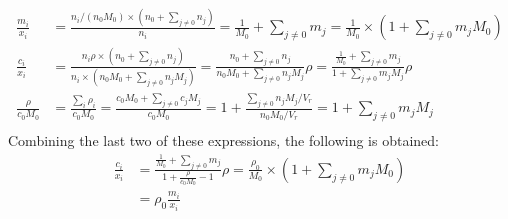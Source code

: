 \documentclass[onecolumn]{article}
\begin{document}
\[
\begin{aligned}
\frac{m_i}{x_i} & = \frac{n_i/(n_0 M_0) \times (n_0 + \sum_{j\neq0}{n_j}) }{n_i} = \frac{1}{M_0} + \sum_{j\neq0}{m_j} = \frac{1}{M_0} \times (1 + \sum_{j\neq0}{m_jM_0}) \\
\frac{c_i}{x_i} & = \frac{n_i \rho \times (n_0 + \sum_{j\neq0}{n_j}) }{n_i \times (n_0 M_0 + \sum_{j\neq0}{n_j M_j})} = \frac{ n_0 + \sum_{j\neq0}{n_j} }{ n_0 M_0 + \sum_{j\neq0}{n_j M_j}} \rho = \frac{ \frac{1}{M_0} + \sum_{j\neq0}{m_j} }{ 1 + \sum_{j\neq0}{m_j M_j}} \rho \\
\frac{\rho}{c_0 M_0} & = \frac{\sum_{i}{\rho_i}}{c_0 M_0} = \frac{c_0 M_0 + \sum_{j \neq 0}{c_j M_j}}{c_0 M_0} = 1 + \frac{\sum_{j\neq0}{n_j M_j/V_r}}{n_0 M_0/V_r} = 1+\sum_{j\neq0}{m_j M_j}\\
\end{aligned}
\]
Combining the last two of these expressions, the following is obtained:
\[
\begin{aligned}
\frac{c_i}{x_i} & = \frac{ \frac{1}{M_0} + \sum_{j\neq0}{m_j} }{ 1 + \frac{\rho}{c_0 M_0} -1} \rho = \frac{\rho_0}{M_0} \times (1 + \sum_{j\neq0}{m_jM_0}) \\
				& = \rho_0 \frac{m_i}{x_i}
\end{aligned}
\]
\end{document}
